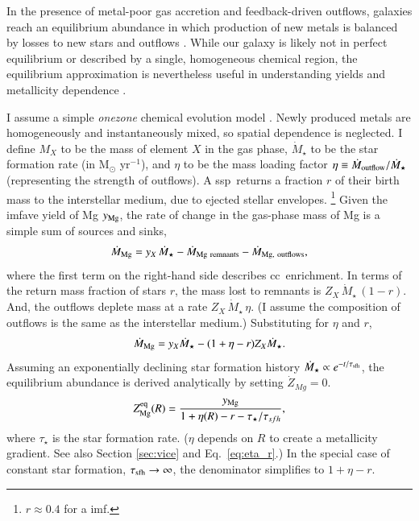 \documentclass[12pt,oneside,letterpaper]{report}
\newcommand{\cc}{\gls{cc}}
\newcommand{\ssp}{\gls{ssp}}
\newcommand{\imf}{\gls{imf}}
\begin{document}
In the presence of metal-poor gas accretion and feedback-driven outflows, galaxies reach an equilibrium abundance in which production of new metals is balanced by losses to new stars and outflows \citep{larson72, dalcanton07, FD08, PS11, lilly13}.
While our galaxy is likely not in perfect equilibrium or described by a single, homogeneous chemical region, the equilibrium approximation is nevertheless useful in understanding yields and metallicity dependence \citep[e.g.][]{james_dwarf,james+23,WAF17}. 

I assume a simple \textit{\gls{onezone}} chemical evolution model \cite[e.g.][]{tinsley80, pagel09, matteucci21}.  Newly produced metals are homogeneously and instantaneously mixed, so spatial dependence is neglected.
I define $M_{X}$ to be the mass of element $X$ in the gas phase, $\dot{M}_\star$ to be the star formation rate (in M$_\odot$ yr$^{-1}$), and $\eta$ to be the mass loading factor $\eta\equiv\dot{M}_{\rm outflow}/\dot{M}_\star$ (representing the strength of outflows). A \ssp\ returns a fraction $r$ of their birth mass to the interstellar medium, due to ejected stellar envelopes.
\footnote{$r\approx0.4$ for a \citealt{kroupa01} \imf.}
Given the \gls{imfave} yield of Mg $y_{\rm Mg}$, the rate of change in the gas-phase mass of Mg is a simple sum of sources and sinks,
\begin{equation}
    \dot{M}_{\rm Mg} =  y_{X}\,\dot{M}_\star - \dot{M}_{\rm Mg~remnants} - \dot{M}_{\rm Mg,~outflows},
\end{equation}
where the first term on the right-hand side describes \cc\ enrichment. 
In terms of the return mass fraction of stars $r$, the mass lost to remnants is $Z_X\,\dot{M}_\star\,(1-r)$.  And, the outflows deplete mass at a rate $Z_X \,\dot{M}_\star\,\eta$. (I assume the composition of outflows is the same as the interstellar medium.) Substituting for $\eta$ and $r$,  
\begin{equation}
    \dot{M}_{\rm Mg}= y_{X} \dot{M}_\star - (1 + \eta - r) Z_{X} \dot{M}_\star.
\end{equation}
Assuming an exponentially declining star formation history $\dot{M}_\star \propto e^{-t/\tau_{\rm sfh}}$, the equilibrium abundance is derived analytically by setting $\dot{Z}_{Mg}=0$.
\begin{equation}\label{eq:z_eq}
    Z_{\rm Mg}^{\rm eq}(R) = \frac{y_{\rm Mg}}{1 + \eta(R) - r - \tau_\star / \tau_{sfh}},
\end{equation}
where $\tau_{\star}$ is the star formation rate. ($\eta$ depends on $R$ to create a metallicity gradient. See also Section \ref{sec:vice} and Eq.~\ref{eq:eta_r}.)
In the special case of constant star formation, $\tau_{\rm sfh}\to\infty$, the denominator simplifies to $1+\eta-r$.
\end{document}
